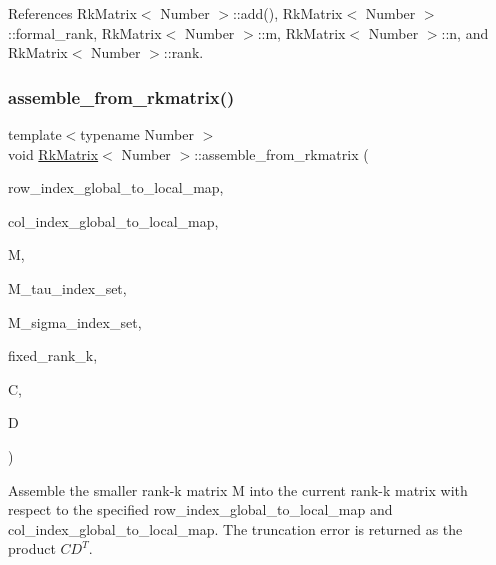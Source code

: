 References Rk\+Matrix$<$ Number $>$\+::add(), Rk\+Matrix$<$ Number $>$\+::formal\+\_\+rank, Rk\+Matrix$<$ Number $>$\+::m, Rk\+Matrix$<$ Number $>$\+::n, and Rk\+Matrix$<$ Number $>$\+::rank.

\mbox{\label{classRkMatrix_aa72bfae68c9471808314edcdce3f9625}} 
\subsubsection{\texorpdfstring{assemble\+\_\+from\+\_\+rkmatrix()}{assemble\_from\_rkmatrix()}\hspace{0.1cm}{\footnotesize\ttfamily [2/2]}}
{\footnotesize\ttfamily template$<$typename Number $>$ \\
void \hyperlink{classRkMatrix}{Rk\+Matrix}$<$ Number $>$\+::assemble\+\_\+from\+\_\+rkmatrix (\begin{DoxyParamCaption}\item[{const std\+::map$<$ types\+::global\+\_\+dof\+\_\+index, size\+\_\+t $>$ \&}]{row\+\_\+index\+\_\+global\+\_\+to\+\_\+local\+\_\+map,  }\item[{const std\+::map$<$ types\+::global\+\_\+dof\+\_\+index, size\+\_\+t $>$ \&}]{col\+\_\+index\+\_\+global\+\_\+to\+\_\+local\+\_\+map,  }\item[{const \hyperlink{classRkMatrix}{Rk\+Matrix}$<$ Number $>$ \&}]{M,  }\item[{const std\+::vector$<$ types\+::global\+\_\+dof\+\_\+index $>$ \&}]{M\+\_\+tau\+\_\+index\+\_\+set,  }\item[{const std\+::vector$<$ types\+::global\+\_\+dof\+\_\+index $>$ \&}]{M\+\_\+sigma\+\_\+index\+\_\+set,  }\item[{const \hyperlink{classRkMatrix_add060bfc3a4cc77f858c3d6dd58cadd5}{size\+\_\+type}}]{fixed\+\_\+rank\+\_\+k,  }\item[{\hyperlink{classLAPACKFullMatrixExt}{L\+A\+P\+A\+C\+K\+Full\+Matrix\+Ext}$<$ Number $>$ \&}]{C,  }\item[{\hyperlink{classLAPACKFullMatrixExt}{L\+A\+P\+A\+C\+K\+Full\+Matrix\+Ext}$<$ Number $>$ \&}]{D }\end{DoxyParamCaption})}

Assemble the smaller rank-\/k matrix {\ttfamily M} into the current rank-\/k matrix with respect to the specified {\ttfamily row\+\_\+index\+\_\+global\+\_\+to\+\_\+local\+\_\+map} and {\ttfamily col\+\_\+index\+\_\+global\+\_\+to\+\_\+local\+\_\+map}. The truncation error is returned as the product $CD^T$.


